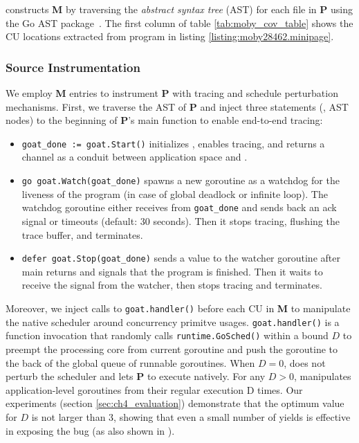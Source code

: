 \goat constructs \textbf{M} by traversing the \textit{abstract syntax tree} (AST) for each file in \textbf{P} using the Go AST package~\cite{go-package-ast}.
%
The first column of table \ref{tab:moby_cov_table} shows the CU locations extracted from program in listing \ref{listing:moby28462.minipage}.

\subsubsection{Source Instrumentation}

We employ \textbf{M} entries to instrument \textbf{P} with tracing and schedule perturbation mechanisms.
%
First, we traverse the AST of \textbf{P} and inject three statements (\ie, AST nodes) to the beginning of \textbf{P}'s main function to enable end-to-end tracing:
\begin{itemize}
  \item \texttt{goat\_done := goat.Start()} initializes \goat, enables tracing, and returns a channel as a conduit between application space and \goat.
  \item \texttt{go goat.Watch(goat\_done)} spawns a new goroutine as a watchdog for the liveness of the program (in case of global deadlock or infinite loop). The watchdog goroutine either receives from \texttt{goat\_done} and sends back an ack signal or timeouts (default: 30 seconds). Then it stops tracing, flushing the trace buffer, and terminates.
  \item \texttt{defer goat.Stop(goat\_done)} sends a value to the watcher goroutine after main returns and signals that the program is finished. Then it waits to receive the signal from the watcher, then stops tracing and terminates.
\end{itemize}

Moreover, we inject calls to \texttt{goat.handler()} before each CU in \textbf{M} to manipulate the native scheduler around concurrency primitve usages. \texttt{goat.handler()} is a function invocation that randomly calls \texttt{runtime.GoSched()} within a bound $D$ to preempt the processing core from current goroutine and push the goroutine to the back of the global queue of runnable goroutines.
%
When $D=0$, \goat does not perturb the scheduler and lets \textbf{P} to execute natively. For any $D>0$, \goat manipulates application-level goroutines from their regular execution D times.
%
Our experiments (section \ref{sec:ch4_evaluation}) demonstrate that the optimum value for $D$ is not larger than 3, showing that even a small number of yields is effective in exposing the bug (as also shown in \cite{burckhardt-depthBug-asplos10}).

